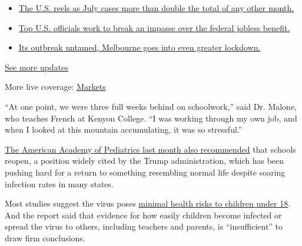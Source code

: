 \begin{itemize}
\tightlist
\item
  \href{https://www.nytimes.com/2020/08/01/world/coronavirus-covid-19.html?action=click\&pgtype=Article\&state=default\&region=MAIN_CONTENT_1\&context=storylines_live_updates\#link-34047410}{The
  U.S. reels as July cases more than double the total of any other
  month.}
\item
  \href{https://www.nytimes.com/2020/08/01/world/coronavirus-covid-19.html?action=click\&pgtype=Article\&state=default\&region=MAIN_CONTENT_1\&context=storylines_live_updates\#link-780ec966}{Top
  U.S. officials work to break an impasse over the federal jobless
  benefit.}
\item
  \href{https://www.nytimes.com/2020/08/01/world/coronavirus-covid-19.html?action=click\&pgtype=Article\&state=default\&region=MAIN_CONTENT_1\&context=storylines_live_updates\#link-2bc8948}{Its
  outbreak untamed, Melbourne goes into even greater lockdown.}
\end{itemize}

\href{https://www.nytimes.com/2020/08/01/world/coronavirus-covid-19.html?action=click\&pgtype=Article\&state=default\&region=MAIN_CONTENT_1\&context=storylines_live_updates}{See
more updates}

More live coverage:
\href{https://www.nytimes.com/live/2020/07/31/business/stock-market-today-coronavirus?action=click\&pgtype=Article\&state=default\&region=MAIN_CONTENT_1\&context=storylines_live_updates}{Markets}

``At one point, we were three full weeks behind on schoolwork,'' said
Dr. Malone, who teaches French at Kenyon College. ``I was working
through my own job, and when I looked at this mountain accumulating, it
was so stressful.''

\href{https://www.nytimes.com/2020/06/30/us/coronavirus-schools-reopening-guidelines-aap.html}{The
American Academy of Pediatrics last month also recommended} that schools
reopen, a position widely cited by the Trump administration, which has
been pushing hard for a return to something resembling normal life
despite soaring infection rates in many states.

Most studies suggest the virus poses
\href{https://www.nytimes.com/2020/07/11/health/coronavirus-schools-reopen.html}{minimal
health risks to children under 18}. And the report said that evidence
for how easily children become infected or spread the virus to others,
including teachers and parents, is ``insufficient'' to draw firm
conclusions.

